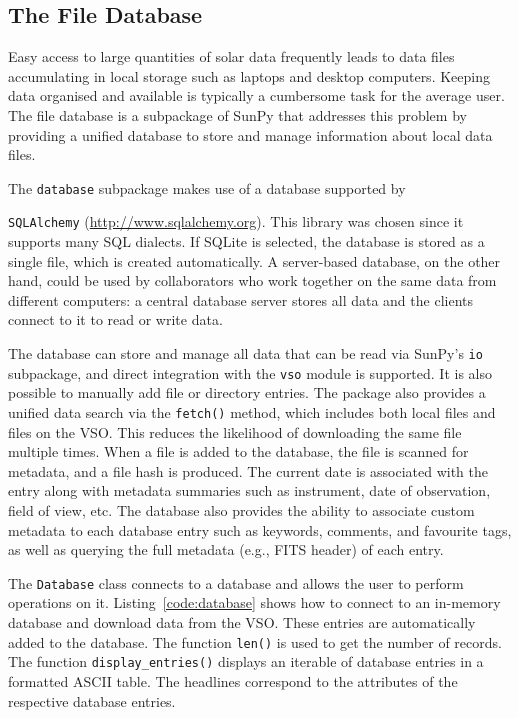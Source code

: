\subsection{The File Database}\label{ssec:db}

Easy access to large quantities of solar data frequently leads to data files accumulating
in local storage such as laptops and desktop computers. Keeping data organised and available
is typically a cumbersome task for the average user. The file database is a subpackage of 
SunPy that addresses this problem by providing a unified database to store and 
manage information about local data files.

The \texttt{database} subpackage makes use of a database supported by
{\texttt{SQLAlchemy} (\href{http://www.sqlalchemy.org}{http://www.sqlalchemy.org}). This library was chosen
since it supports many SQL dialects. 
If SQLite is selected, the database is stored as a single file, which is
created automatically. A server-based database, on the other hand, could be used
by collaborators who work together on the
same data from different computers: a central database server stores all data and the clients connect to
it to read or write data.

The database can store and manage all data that can be read via SunPy's 
\texttt{io} subpackage, and direct integration with the \texttt{vso} 
module is supported.
It is also possible to manually add file or directory entries. The package also provides
a unified data search via the \texttt{fetch()} method, which includes both local files
and files on the \textsc{VSO}. This reduces the likelihood of downloading the same file 
multiple times. When a file is added to the database, the file is scanned for metadata,
and a file hash is produced. 
The current date is associated with the entry along with metadata summaries such 
as instrument, date of observation, field of view, etc. 
The database also provides the ability to associate custom metadata to 
each database entry such as keywords, comments, and favourite tags, as well as 
querying the full metadata (e.g., FITS header) of each entry.

The \texttt{Database} class connects to a database and allows the user to 
perform operations on it. Listing~\ref{code:database} shows how to connect
to an in-memory database and download data from the \textsc{VSO}. These entries are
automatically added to the database. The function \texttt{len()} is used to get the number of
records. The function \texttt{display\_entries()} displays an iterable of 
database entries in a formatted \textsc{ASCII} table. The headlines 
correspond to the attributes of the respective database entries.

}
